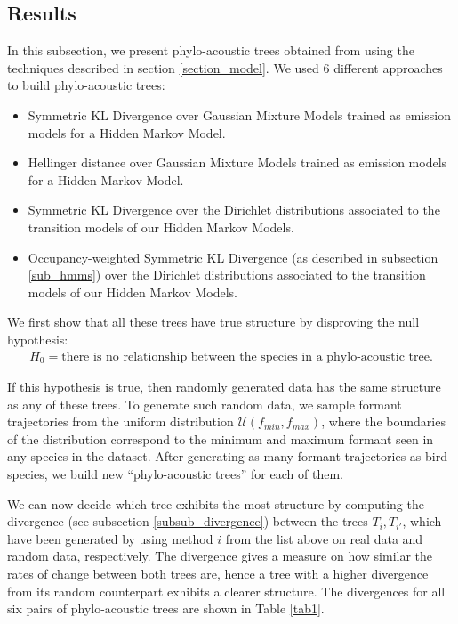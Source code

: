 \documentclass[pdftex,11pt,a4paper]{article}
\theoremstyle{definition}
\theoremstyle{remark}
\begin{document}
\subsection{Results}
\label{sub_results}
In this subsection, we present phylo-acoustic trees obtained from using the techniques described in section \ref{section_model}. We used 6 different approaches to build phylo-acoustic trees:
\begin{itemize}
\item Symmetric KL Divergence over Gaussian Mixture Models trained as emission models for a Hidden Markov Model.
\item Hellinger distance over Gaussian Mixture Models trained as emission models for a Hidden Markov Model.
\item Symmetric KL Divergence over the Dirichlet distributions associated to the transition models of our Hidden Markov Models.
\item Occupancy-weighted Symmetric KL Divergence (as described in subsection \ref{sub_hmms}) over the Dirichlet distributions associated to the transition models of our Hidden Markov Models.
\end{itemize}
\par We first show that all these trees have true structure by 
disproving the null hypothesis:
\begin{align*}
H_0 = \text{there is no relationship between the species in a phylo-acoustic tree.}
\end{align*}
\par If this hypothesis is true, then randomly generated data has the same structure as any of these trees. To generate such random data, we sample formant trajectories from the uniform distribution $\mathcal{U}(f_{min}, f_{max})$, where the boundaries of the distribution correspond to the minimum and maximum formant seen in any species in the dataset. After generating as many formant trajectories as bird species, we build new ``phylo-acoustic trees'' for each of them.
\par We can now decide which tree exhibits the most structure by computing the divergence (see subsection \ref{subsub_divergence}) between the trees $T_i, T_{i'}$, which have been generated by using method $i$ from the list above on real data and random data, respectively. The divergence gives a measure on how similar the rates of change between both trees are, hence a tree with a higher divergence from its random counterpart exhibits a clearer structure. The divergences for all six pairs of phylo-acoustic trees are shown in Table \ref{tab1}.
\end{document}
